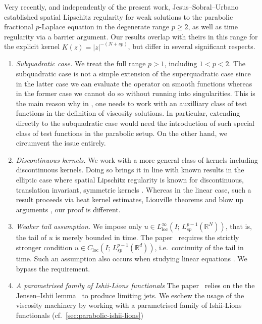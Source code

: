 \documentclass[11pt, a4paper, twoside]{article}
\theoremstyle{definition}
\theoremstyle{remark}
\newcommand{\R}{\mathbb{R}}
\begin{document}
Very recently, and independently of the present work,
Jesus--Sobral--Urbano~\cite{JesusSobralUrbano2026} established
spatial Lipschitz regularity for weak solutions to the
parabolic fractional $p$-Laplace equation in the degenerate
range $p \ge 2$, as well as time regularity via a
barrier argument. Our results overlap with theirs in this range
for the explicit kernel $K(z) = |z|^{-(N+sp)}$, but differ in
several significant respects.

\begin{enumerate}[label=(\roman*)]
\item \emph{Subquadratic case.} We treat the full range
  $p > 1$, including $1 < p < 2$. The subquadratic case is not a simple extension
  of the superquadratic case since in the latter case we can evaluate the operator on smooth
  functions whereas in the former case we cannot do so without running into singularities. This is the main reason why in \cite{KorvenpaaKuusiLindgren2019}, one needs to work with  an auxilliary class of test functions in the definition of viscosity solutions. In particular, extending \cite{JesusSobralUrbano2026} directly to the subquadratic case would need the introduction of such special class of test functions in the parabolic setup. On the other hand, we circumvent the issue entirely. 

\item \emph{Discontinuous kernels.} We work with a more general class of kernels including discontinuous kernels. Doing so brings it in line with known results in the elliptic case where spatial Lipschitz 
  regularity is known for discontinuous, translation invariant, symmetric kernels \cite{RosOtonSerra2016RegularityGeneralStable, FernandezRealRosOton2017RegularityParabolic}. Whereas in the linear case, such a result proceeds via heat kernel estimates, Liouville theorems and blow up arguments \cite[Theorem 2.4.3]{fernandezreal2024integrodifferentialellipticequations}, our proof is different. 

\item \emph{Weaker tail assumption.} We impose only
  $u \in L^\infty_{\mathrm{loc}}(I;\, L^{p-1}_{sp}(\R^N))$,
  that is, the tail of $u$ is merely bounded in time.
  The paper~\cite{JesusSobralUrbano2026} requires the
  strictly stronger condition
  $u \in C_{\mathrm{loc}}(I;\, L^{p-1}_{sp}(\R^d))$,
  i.e.\ continuity of the tail in time. Such an assumption also occurs when studying linear 
  equations \cite{LaraDavila}. We bypass the requirement. 
  
\item \emph{A parametrised family of Ishii-Lions functionals} The
  paper~\cite{JesusSobralUrbano2026} relies on the the Jensen--Ishii
  lemma~\cite[Theorem 8.3]{CrandallIshiiLions1992} to produce limiting
  jets. We eschew the usage of the 
  viscosity machinery by working with a parametrised family of Ishii-Lions functionals (cf.~\cref{sec:parabolic-ishii-lions})
\end{enumerate}
\end{document}

